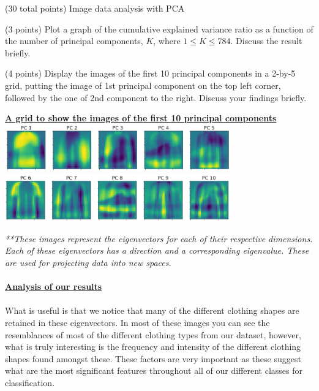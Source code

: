 \documentclass[12pt]{article}
\begin{document}
\begin{question}{(30 total points) Image data analysis with PCA}
\begin{subquestion}{(3 points)
       Plot a graph of the cumulative explained variance ratio as a function of the number of principal components, $K$, where $1\le K \le 784$.
       Discuss the result briefly.
     }
   \end{subquestion}

   \begin{subquestion}{(4 points)
      Display the images of the first 10 principal components in
      a 2-by-5 grid, putting the image of 1st principal component on
      the top left corner, followed by the one of 2nd component to the right.
      Discuss your findings briefly.
     } \label{Q1.disp.pca}
   

      \begin{answerbox}{35em}
        \begin{center}
        \textbf{\underline{A grid to show the images of the first 10 principal components}}
        \vspace{0.25cm}\\
         \includegraphics[width=0.73\textwidth]{images/q151.png}
         \includegraphics[width=0.73\textwidth]{images/q152.png}
        \end{center}
        \scriptsize{
        \emph{**These images represent the eigenvectors for each of their respective dimensions. Each of these eigenvectors has a direction and a corresponding eigenvalue. These are used for projecting data into new spaces.}\\
\\
        \textbf{\footnotesize{\underline{Analysis of our results}}}\\
\\
        What is useful is that we notice that many of the different clothing shapes are retained in these eigenvectors. In most of these images you can see the resemblances of most of the different clothing types from our dataset, however, what is truly interesting is the frequency and intensity of the different clothing shapes found amongst these. These factors are very important as these suggest what are the most significant features throughout all of our different classes for classification.\\
\\
}
\end{answerbox}
\end{subquestion}
\end{question}
\end{document}
